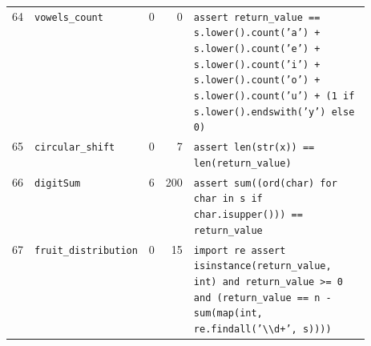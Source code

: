 \begin{footnotesize}
\begin{longtable}{@{}r l r r p{0.52\linewidth}@{}}
64 & \texttt{vowels\_count} & 0 & 0 & \texttt{assert \allowbreak{}return\_value \allowbreak{}=\allowbreak{}=\allowbreak{} \allowbreak{}s.\allowbreak{}lower(\allowbreak{})\allowbreak{}.\allowbreak{}count(\allowbreak{}'\allowbreak{}a'\allowbreak{})\allowbreak{} \allowbreak{}+\allowbreak{} \allowbreak{}s.\allowbreak{}lower(\allowbreak{})\allowbreak{}.\allowbreak{}count(\allowbreak{}'\allowbreak{}e'\allowbreak{})\allowbreak{} \allowbreak{}+\allowbreak{} \allowbreak{}s.\allowbreak{}lower(\allowbreak{})\allowbreak{}.\allowbreak{}count(\allowbreak{}'\allowbreak{}i'\allowbreak{})\allowbreak{} \allowbreak{}+\allowbreak{} \allowbreak{}s.\allowbreak{}lower(\allowbreak{})\allowbreak{}.\allowbreak{}count(\allowbreak{}'\allowbreak{}o'\allowbreak{})\allowbreak{} \allowbreak{}+\allowbreak{} \allowbreak{}s.\allowbreak{}lower(\allowbreak{})\allowbreak{}.\allowbreak{}count(\allowbreak{}'\allowbreak{}u'\allowbreak{})\allowbreak{} \allowbreak{}+\allowbreak{} \allowbreak{}(\allowbreak{}1 \allowbreak{}if \allowbreak{}s.\allowbreak{}lower(\allowbreak{})\allowbreak{}.\allowbreak{}endswith(\allowbreak{}'\allowbreak{}y'\allowbreak{})\allowbreak{} \allowbreak{}else \allowbreak{}0)\allowbreak{}} \\
65 & \texttt{circular\_shift} & 0 & 7 & \texttt{assert \allowbreak{}len(\allowbreak{}str(\allowbreak{}x)\allowbreak{})\allowbreak{} \allowbreak{}=\allowbreak{}=\allowbreak{} \allowbreak{}len(\allowbreak{}return\_value)\allowbreak{}} \\
66 & \texttt{digitSum} & 6 & 200 & \texttt{assert \allowbreak{}sum(\allowbreak{}(\allowbreak{}ord(\allowbreak{}char)\allowbreak{} \allowbreak{}for \allowbreak{}char \allowbreak{}in \allowbreak{}s \allowbreak{}if \allowbreak{}char.\allowbreak{}isupper(\allowbreak{})\allowbreak{})\allowbreak{})\allowbreak{} \allowbreak{}=\allowbreak{}=\allowbreak{} \allowbreak{}return\_value} \\
67 & \texttt{fruit\_distribution} & 0 & 15 & \texttt{import \allowbreak{}re
assert \allowbreak{}isinstance(\allowbreak{}return\_value,\allowbreak{} \allowbreak{}int)\allowbreak{} \allowbreak{}and \allowbreak{}return\_value \allowbreak{}>\allowbreak{}=\allowbreak{} \allowbreak{}0 \allowbreak{}and \allowbreak{}(\allowbreak{}return\_value \allowbreak{}=\allowbreak{}=\allowbreak{} \allowbreak{}n \allowbreak{}-\allowbreak{} \allowbreak{}sum(\allowbreak{}map(\allowbreak{}int,\allowbreak{} \allowbreak{}re.\allowbreak{}findall(\allowbreak{}'\allowbreak{}\textbackslash{}\textbackslash{}d+\allowbreak{}'\allowbreak{},\allowbreak{} \allowbreak{}s)\allowbreak{})\allowbreak{})\allowbreak{})\allowbreak{}} \\

\end{longtable}
\end{footnotesize}
